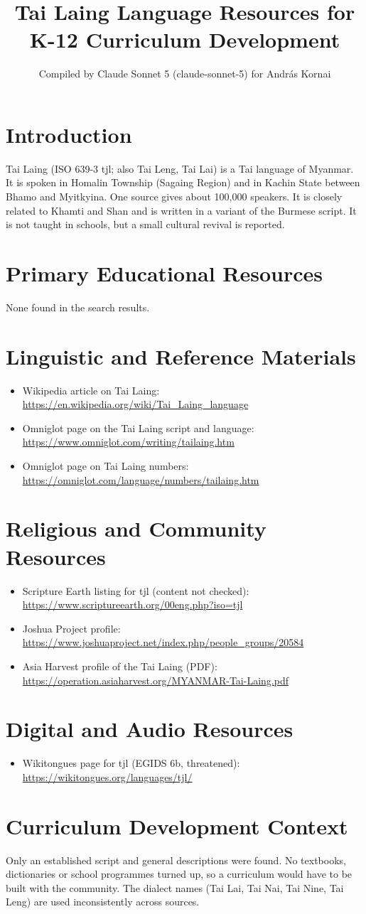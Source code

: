 \documentclass[12pt]{article}
\title{Tai Laing Language Resources for K-12 Curriculum Development}
\author{Compiled by Claude Sonnet 5 (claude-sonnet-5) for Andr\'as Kornai}
\date{}
\begin{document}
\maketitle
\section{Introduction}
Tai Laing (ISO 639-3 tjl; also Tai Leng, Tai Lai) is a Tai language of Myanmar. It is spoken in Homalin Township (Sagaing Region) and in Kachin State between Bhamo and Myitkyina. One source gives about 100,000 speakers. It is closely related to Khamti and Shan and is written in a variant of the Burmese script. It is not taught in schools, but a small cultural revival is reported.
\section{Primary Educational Resources}
None found in the search results.
\section{Linguistic and Reference Materials}
\begin{itemize}
\item Wikipedia article on Tai Laing: \url{https://en.wikipedia.org/wiki/Tai_Laing_language}
\item Omniglot page on the Tai Laing script and language: \url{https://www.omniglot.com/writing/tailaing.htm}
\item Omniglot page on Tai Laing numbers: \url{https://omniglot.com/language/numbers/tailaing.htm}
\end{itemize}
\section{Religious and Community Resources}
\begin{itemize}
\item Scripture Earth listing for tjl (content not checked): \url{https://www.scriptureearth.org/00eng.php?iso=tjl}
\item Joshua Project profile: \url{https://www.joshuaproject.net/index.php/people_groups/20584}
\item Asia Harvest profile of the Tai Laing (PDF): \url{https://operation.asiaharvest.org/MYANMAR-Tai-Laing.pdf}
\end{itemize}
\section{Digital and Audio Resources}
\begin{itemize}
\item Wikitongues page for tjl (EGIDS 6b, threatened): \url{https://wikitongues.org/languages/tjl/}
\end{itemize}
\section{Curriculum Development Context}
Only an established script and general descriptions were found. No textbooks, dictionaries or school programmes turned up, so a curriculum would have to be built with the community. The dialect names (Tai Lai, Tai Nai, Tai Nine, Tai Leng) are used inconsistently across sources.
\end{document}

